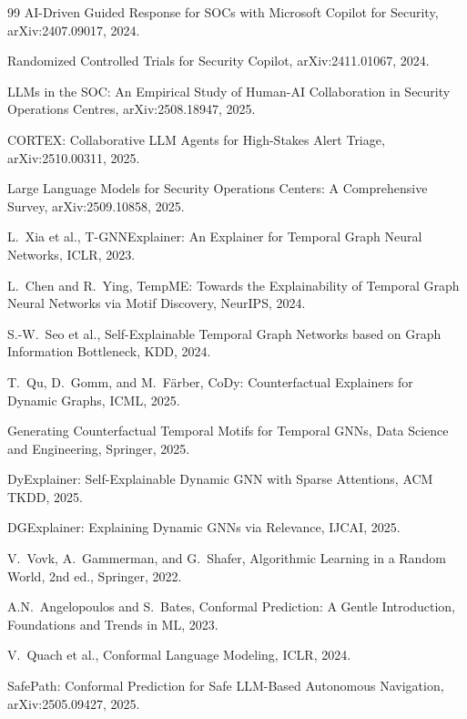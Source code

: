 \documentclass[preprint,review,12pt]{elsarticle}
\begin{document}
\begin{thebibliography}{99}
 AI-Driven Guided Response for SOCs with Microsoft Copilot for Security, arXiv:2407.09017, 2024.

 Randomized Controlled Trials for Security Copilot, arXiv:2411.01067, 2024.

 LLMs in the SOC: An Empirical Study of Human-AI Collaboration in Security Operations Centres, arXiv:2508.18947, 2025.

 CORTEX: Collaborative LLM Agents for High-Stakes Alert Triage, arXiv:2510.00311, 2025.

 Large Language Models for Security Operations Centers: A Comprehensive Survey, arXiv:2509.10858, 2025.

 L.~Xia et al., T-GNNExplainer: An Explainer for Temporal Graph Neural Networks, ICLR, 2023.

 L.~Chen and R.~Ying, TempME: Towards the Explainability of Temporal Graph Neural Networks via Motif Discovery, NeurIPS, 2024.

 S.-W.~Seo et al., Self-Explainable Temporal Graph Networks based on Graph Information Bottleneck, KDD, 2024.

 T.~Qu, D.~Gomm, and M.~F\"{a}rber, CoDy: Counterfactual Explainers for Dynamic Graphs, ICML, 2025.

 Generating Counterfactual Temporal Motifs for Temporal GNNs, Data Science and Engineering, Springer, 2025.

 DyExplainer: Self-Explainable Dynamic GNN with Sparse Attentions, ACM TKDD, 2025.

 DGExplainer: Explaining Dynamic GNNs via Relevance, IJCAI, 2025.

 V.~Vovk, A.~Gammerman, and G.~Shafer, Algorithmic Learning in a Random World, 2nd ed., Springer, 2022.

 A.N.~Angelopoulos and S.~Bates, Conformal Prediction: A Gentle Introduction, Foundations and Trends in ML, 2023.

 V.~Quach et al., Conformal Language Modeling, ICLR, 2024.

 SafePath: Conformal Prediction for Safe LLM-Based Autonomous Navigation, arXiv:2505.09427, 2025.


\end{thebibliography}
\end{document}
